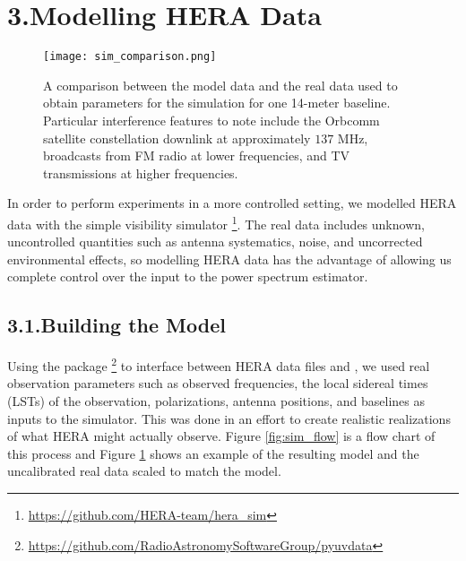 \documentclass[12pt]{article}
\begin{document}
\tocless\section{\hypertarget{sec:modelling}{3.\hspace{0.75em}Modelling HERA Data}}

\begin{figure}[p]
	\centering
	\texttt{[image: sim\_comparison.png]}
	\caption[Comparison of simulated and real data]{A comparison between the model data and the real data used to obtain parameters for the simulation for one 14-meter baseline. Particular interference features to note include the Orbcomm satellite constellation downlink at approximately $137$ MHz, broadcasts from FM radio at lower frequencies, and TV transmissions at higher frequencies.}
	\label{fig:sim_comparison}
\end{figure}

In order to perform experiments in a more controlled setting, we modelled HERA data with the simple visibility simulator \herasim\footnote{\url{https://github.com/HERA-team/hera_sim}}. The real data includes unknown, uncontrolled quantities such as antenna systematics, noise, and uncorrected environmental effects, so modelling HERA data has the advantage of allowing us complete control over the input to the power spectrum estimator. \vspace{3mm}

\tocless\subsection{\hypertarget{subsec:simdata}{3.1.\hspace{0.75em}Building the Model}}

Using the package \pyuvdata\footnote{\url{https://github.com/RadioAstronomySoftwareGroup/pyuvdata}} to interface between HERA data files and \herasim, we used real observation parameters such as observed frequencies, the local sidereal times (LSTs) of the observation, polarizations, antenna positions, and baselines as inputs to the simulator. This was done in an effort to create realistic realizations of what HERA might actually observe. Figure \ref{fig:sim_flow} is a flow chart of this process and Figure \ref{fig:sim_comparison} shows an example of the resulting model and the uncalibrated real data scaled to match the model.
\end{document}
